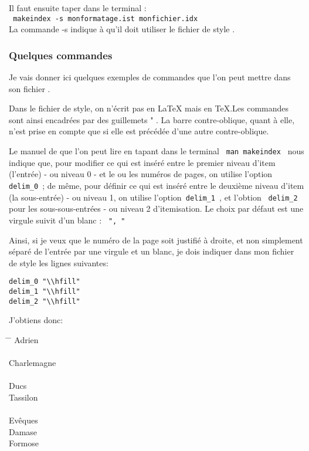 Il faut ensuite taper dans le terminal :\\
\verb+ makeindex -s monformatage.ist monfichier.idx +\\
La commande -s indique à   qu'il doit utiliser le fichier de style  .

\subsubsection{Quelques commandes}

Je vais donner ici quelques exemples de commandes que l'on peut mettre dans son fichier . 

\begin{attention}
Dans le fichier de style, on n'écrit pas en \LaTeX{} mais en \TeX .Les commandes sont ainsi encadrées par des guillemets " . La barre contre-oblique, quant à elle, n'est prise en compte que si elle est précédée d'une autre contre-oblique.
\end{attention}

Le manuel de  que l'on peut lire en tapant dans le terminal \verb+ man makeindex + nous indique que, pour modifier ce qui est inséré entre le premier niveau d'item (l'entrée) - ou niveau 0 -  et le ou les numéros de pages, on utilise l'option\verb| delim_0 |; de même, pour définir ce qui est inséré entre le deuxième niveau d'item (la sous-entrée) - ou niveau 1, on utilise l'option\verb+ delim_1 +, et l'obtion \verb| delim_2 | pour les sous-sous-entrées - ou niveau 2 d'itemisation. Le choix par défaut est une virgule suivit d'un blanc : \verb| ", " |

Ainsi, si je veux que le numéro de la page soit justifié à droite, et non simplement séparé de l'entrée par une virgule et un blanc, je dois indiquer dans mon fichier de style les lignes suivantes:

\begin{verbatim}
delim_0 "\\hfill"
delim_1 "\\hfill"
delim_2 "\\hfill"
\end{verbatim}

J'obtiens donc: 
\begin{tabbing}
\hspace{0,5cm}  \=  \hspace{3cm} \= \kill
Adrien\> \\
\\
Charlemagne \> \\
\\
Ducs \\
\> Tassilon\\
\\
Evêques \\
\> Damase \\
\> Formose\\

\end{tabbing}

